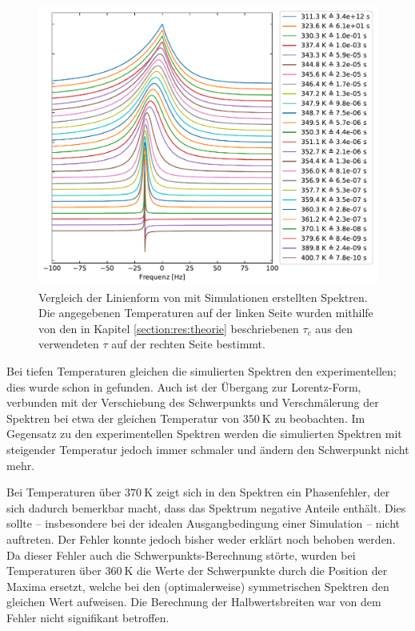 \begin{figure}
	\begin{center}
		\includegraphics[width=\textwidth]{graphics/plot/sim_lineshape.pdf}
	\end{center}
	\caption{Vergleich der Linienform von mit Simulationen erstellten Spektren. Die angegebenen Temperaturen auf der linken Seite wurden mithilfe von den in Kapitel \ref{section:res:theorie} beschriebenen $\tau_c$ aus den verwendeten $\tau$ auf der rechten Seite bestimmt.} \label{fig:res:sim_linienform}
\end{figure}

Bei tiefen Temperaturen gleichen die simulierten Spektren den experimentellen; dies wurde schon in \cite{joachim_master} gefunden. Auch ist der Übergang zur Lorentz-Form, verbunden mit der Verschiebung des Schwerpunkts und Verschmälerung der Spektren bei etwa der gleichen Temperatur von $\SI{350}{\kelvin}$ zu beobachten. Im Gegensatz zu den experimentellen Spektren werden die simulierten Spektren mit steigender Temperatur jedoch immer schmaler und ändern den Schwerpunkt nicht mehr.

Bei Temperaturen über $\SI{370}{\kelvin}$ zeigt sich in den Spektren ein Phasenfehler, der sich dadurch bemerkbar macht, dass das Spektrum negative Anteile enthält. Dies sollte -- insbesondere bei der idealen Ausgangbedingung einer Simulation -- nicht auftreten. Der Fehler konnte jedoch bisher weder erklärt noch behoben werden. Da dieser Fehler auch die Schwerpunkts-Berechnung störte, wurden bei Temperaturen über $\SI{360}{\kelvin}$ die Werte der Schwerpunkte durch die Position der Maxima ersetzt, welche bei den (optimalerweise) symmetrischen Spektren den gleichen Wert aufweisen. Die Berechnung der Halbwertsbreiten war von dem Fehler nicht signifikant betroffen.

